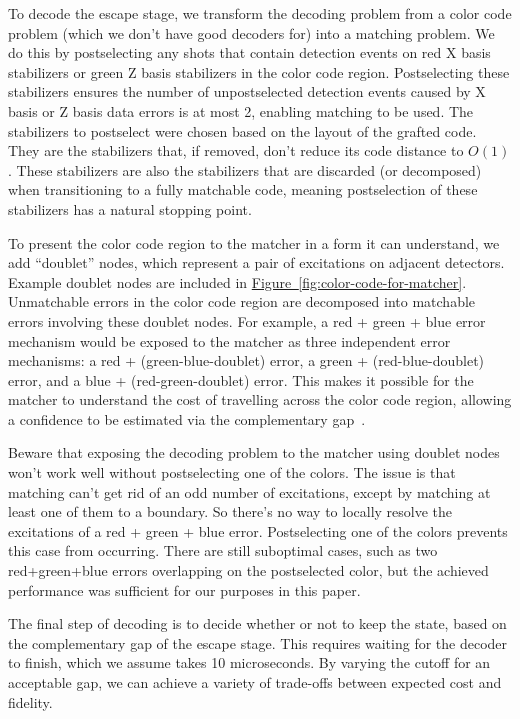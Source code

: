 \documentclass[onecolumn,unpublished,a4paper]{quantumarticle}
\theoremstyle{definition}
\newcommand{\fig}[1]{\hyperref[fig:#1]{Figure~\ref*{fig:#1}}}
\begin{document}
To decode the escape stage, we transform the decoding problem from a color code problem (which we don't have good decoders for) into a matching problem.
We do this by postselecting any shots that contain detection events on red X basis stabilizers or green Z basis stabilizers in the color code region.
Postselecting these stabilizers ensures the number of unpostselected detection events caused by X basis or Z basis data errors is at most 2, enabling matching to be used.
The stabilizers to postselect were chosen based on the layout of the grafted code.
They are the stabilizers that, if removed, don't reduce its code distance to $O(1)$.
These stabilizers are also the stabilizers that are discarded (or decomposed) when transitioning to a fully matchable code, meaning postselection of these stabilizers has a natural stopping point.

To present the color code region to the matcher in a form it can understand, we add ``doublet'' nodes, which represent a pair of excitations on adjacent detectors.
Example doublet nodes are included in \fig{color-code-for-matcher}.
Unmatchable errors in the color code region are decomposed into matchable errors involving these doublet nodes.
For example, a red + green + blue error mechanism would be exposed to the matcher as three independent error mechanisms: a red + (green-blue-doublet) error, a green + (red-blue-doublet) error, and a blue + (red-green-doublet) error.
This makes it possible for the matcher to understand the cost of travelling across the color code region, allowing a confidence to be estimated via the complementary gap~\cite{gidney2024yoked}.

Beware that exposing the decoding problem to the matcher using doublet nodes won't work well without postselecting one of the colors.
The issue is that matching can't get rid of an odd number of excitations, except by matching at least one of them to a boundary.
So there's no way to locally resolve the excitations of a red + green + blue error.
Postselecting one of the colors prevents this case from occurring.
There are still suboptimal cases, such as two red+green+blue errors overlapping on the postselected color, but the achieved performance was sufficient for our purposes in this paper.

The final step of decoding is to decide whether or not to keep the state, based on the complementary gap of the escape stage.
This requires waiting for the decoder to finish, which we assume takes 10 microseconds.
By varying the cutoff for an acceptable gap, we can achieve a variety of trade-offs between expected cost and fidelity.
\end{document}
